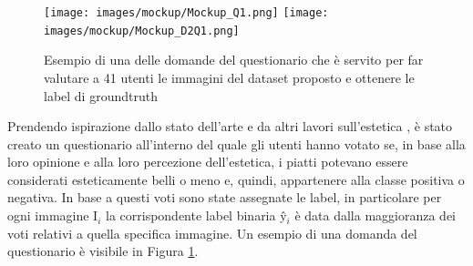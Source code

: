 \begin{figure}[H]
\centering
\texttt{[image: images/mockup/Mockup\_Q1.png]}
\quad
\texttt{[image: images/mockup/Mockup\_D2Q1.png]}
\quad
\caption{Esempio di una delle domande del questionario che è servito per far valutare a 41 utenti le immagini del dataset proposto e ottenere le label di groundtruth}
\label{questionario1}
\end{figure}

Prendendo ispirazione dallo stato dell'arte e da altri lavori sull'estetica \cite{sheng2021learning},  è stato creato un questionario all'interno del quale gli utenti hanno votato se, in base alla loro opinione e alla loro percezione dell'estetica, i piatti potevano essere considerati esteticamente belli o meno e, quindi, appartenere alla classe positiva o negativa. In base a questi voti sono state assegnate le label, in particolare per ogni immagine I$_i$ la corrispondente label binaria \^y$_{i}$ è data dalla maggioranza dei voti relativi a quella specifica immagine. Un esempio di una domanda del questionario è visibile in Figura \ref{questionario1}.

